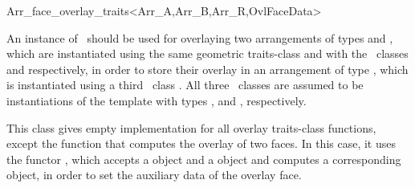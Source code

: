 
\ccRefPageBegin

\begin{ccRefClass}{Arr_face_overlay_traits<Arr_A,Arr_B,Arr_R,OvlFaceData>}

\ccDefinition

An instance of \ccRefName\ should be used for overlaying two arrangements
of types  and , which are instantiated using the same
geometric traits-class and with the \dcel\ classes  and
 respectively, in order to store their overlay in an arrangement
of type , which is instantiated using a third \dcel\ class
. All three \dcel\ classes are assumed to be instantiations of the
 template with types ,
 and , respectively.

This class gives empty implementation for all overlay traits-class functions,
except the function that computes the overlay of two faces. In this case,
it uses the functor , which accepts a  object
and a  object and computes a corresponding 
object, in order to set the auxiliary data of the overlay face.


\ccIsModel

\ccSeeAlso
     \\
     \\

\end{ccRefClass}

\ccRefPageEnd
